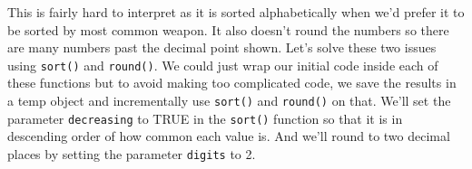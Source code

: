 \documentclass[
  12pt,
  openany]{book}
\newenvironment{Shaded}{\begin{snugshade}}{\end{snugshade}}
\newcommand{\AttributeTok}[1]{\textcolor[rgb]{0.61,0.61,0.61}{#1}}
\newcommand{\CommentTok}[1]{\textcolor[rgb]{0.37,0.37,0.37}{\textit{#1}}}
\newcommand{\ConstantTok}[1]{\textcolor[rgb]{0,0,0}{#1}}
\newcommand{\DecValTok}[1]{\textcolor[rgb]{0.06,0.06,0.06}{#1}}
\newcommand{\FunctionTok}[1]{\textcolor[rgb]{0,0,0}{#1}}
\newcommand{\NormalTok}[1]{#1}
\newcommand{\OtherTok}[1]{\textcolor[rgb]{0.37,0.37,0.37}{#1}}
\newcommand{\SpecialCharTok}[1]{\textcolor[rgb]{0,0,0}{#1}}
\begin{document}
This is fairly hard to interpret as it is sorted alphabetically when we'd prefer it to be sorted by most common weapon. It also doesn't round the numbers so there are many numbers past the decimal point shown. Let's solve these two issues using \texttt{sort()} and \texttt{round()}. We could just wrap our initial code inside each of these functions but to avoid making too complicated code, we save the results in a temp object and incrementally use \texttt{sort()} and \texttt{round()} on that. We'll set the parameter \texttt{decreasing} to TRUE in the \texttt{sort()} function so that it is in descending order of how common each value is. And we'll round to two decimal places by setting the parameter \texttt{digits} to 2.

\begin{Shaded}
\end{Shaded}
\end{document}
